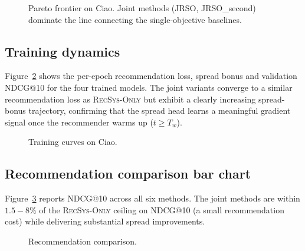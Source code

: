 \documentclass[conference]{IEEEtran}
\begin{document}
\begin{figure}[t]
\centering
\caption{Pareto frontier on Ciao. Joint methods (JRSO,
JRSO\_second) dominate the line connecting the single-objective
baselines.}
\label{fig:pareto}
\end{figure}

\subsection{Training dynamics}
Figure~\ref{fig:curves} shows the per-epoch recommendation loss,
spread bonus and validation NDCG@10 for the four trained models. The
joint variants converge to a similar recommendation loss as
\textsc{RecSys-Only} but exhibit a clearly increasing spread-bonus
trajectory, confirming that the spread head learns a meaningful
gradient signal once the recommender warms up
($t\!\ge\!T_w$).

\begin{figure}[t]
\centering
\caption{Training curves on Ciao.}
\label{fig:curves}
\end{figure}

\subsection{Recommendation comparison bar chart}
Figure~\ref{fig:reccmp} reports NDCG@10 across all six methods. The
joint methods are within $1.5\!-\!8\%$ of the
\textsc{RecSys-Only} ceiling on NDCG@10 (a small recommendation cost)
while delivering substantial spread improvements.

\begin{figure}[t]
\centering
\caption{Recommendation comparison.}
\label{fig:reccmp}
\end{figure}
\end{document}
